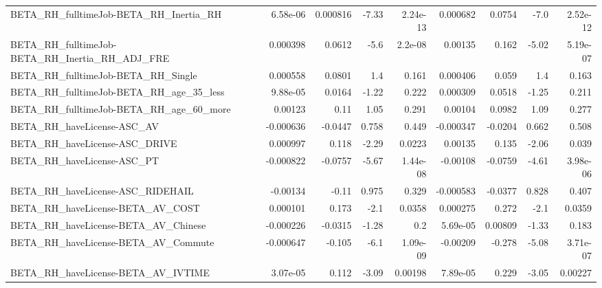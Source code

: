 \begin{tabular}{lrrrrrrrr}
BETA\_RH\_fulltimeJob-BETA\_RH\_Inertia\_RH             &    6.58e-06 &     0.000816 &    -7.33 & 2.24e-13 &   0.000682 &      0.0754 &         -7.0 &      2.52e-12 \\
BETA\_RH\_fulltimeJob-BETA\_RH\_Inertia\_RH\_ADJ\_FRE     &    0.000398 &       0.0612 &     -5.6 &  2.2e-08 &    0.00135 &       0.162 &        -5.02 &      5.19e-07 \\
BETA\_RH\_fulltimeJob-BETA\_RH\_Single                 &    0.000558 &       0.0801 &      1.4 &    0.161 &   0.000406 &       0.059 &          1.4 &         0.163 \\
BETA\_RH\_fulltimeJob-BETA\_RH\_age\_35\_less            &    9.88e-05 &       0.0164 &    -1.22 &    0.222 &   0.000309 &      0.0518 &        -1.25 &         0.211 \\
BETA\_RH\_fulltimeJob-BETA\_RH\_age\_60\_more            &     0.00123 &         0.11 &     1.05 &    0.291 &    0.00104 &      0.0982 &         1.09 &         0.277 \\
BETA\_RH\_haveLicense-ASC\_AV                         &   -0.000636 &      -0.0447 &    0.758 &    0.449 &  -0.000347 &     -0.0204 &        0.662 &         0.508 \\
BETA\_RH\_haveLicense-ASC\_DRIVE                      &    0.000997 &        0.118 &    -2.29 &   0.0223 &    0.00135 &       0.135 &        -2.06 &         0.039 \\
BETA\_RH\_haveLicense-ASC\_PT                         &   -0.000822 &      -0.0757 &    -5.67 & 1.44e-08 &   -0.00108 &     -0.0759 &        -4.61 &      3.98e-06 \\
BETA\_RH\_haveLicense-ASC\_RIDEHAIL                   &    -0.00134 &        -0.11 &    0.975 &    0.329 &  -0.000583 &     -0.0377 &        0.828 &         0.407 \\
BETA\_RH\_haveLicense-BETA\_AV\_COST                   &    0.000101 &        0.173 &     -2.1 &   0.0358 &   0.000275 &       0.272 &         -2.1 &        0.0359 \\
BETA\_RH\_haveLicense-BETA\_AV\_Chinese                &   -0.000226 &      -0.0315 &    -1.28 &      0.2 &   5.69e-05 &     0.00809 &        -1.33 &         0.183 \\
BETA\_RH\_haveLicense-BETA\_AV\_Commute                &   -0.000647 &       -0.105 &     -6.1 & 1.09e-09 &   -0.00209 &      -0.278 &        -5.08 &      3.71e-07 \\
BETA\_RH\_haveLicense-BETA\_AV\_IVTIME                 &    3.07e-05 &        0.112 &    -3.09 &  0.00198 &   7.89e-05 &       0.229 &        -3.05 &       0.00227 \\

\end{tabular}
